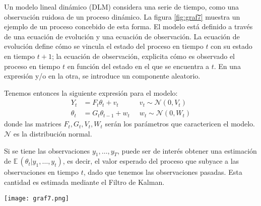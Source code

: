 \documentclass{article}\usepackage[]{graphicx}\usepackage[]{color}
\newcommand{\E}{\mathbb{E} \,}
\begin{document}
%

Un modelo lineal dinámico (DLM) considera una serie de tiempo, como una observación ruidosa de un proceso dinámico. La figura \ref{fig:graf7} muestra un ejemplo de un proceso concebido de esta forma. El modelo está definido a través de una ecuación de evolución y una ecuación de observación. La ecuación de evolución define cómo se vincula el estado del proceso en tiempo $t$ con su estado en tiempo $t+1$; la ecuación de observación, explicita cómo es observado el proceso en tiempo $t$ en función del estado en el que se encuentra a $t$. En una expresión y/o en la otra, se introduce un componente aleatorio.

Tenemos entonces la siguiente expresión para el modelo:
\begin{equation}
\begin{aligned}
Y_t&=F_t\theta_t + v_t  \;&\;  v_t \sim \mathcal{N}(0,V_t) \\
\theta_t &= G_t \theta_{t-1} + w_t \;&\; w_t \sim \mathcal{N}(0,W_t)
\end{aligned}
\label{eq:modelo}
\end{equation} donde las matrices $F_t,G_t,V_t,W_t$ serán los parámetros que caractericen el modelo. $\mathcal{N}$ es la distribución normal.

Si se tiene las observaciones $y_1,\dots,y_T$, puede ser de interés obtener una estimación de $\E(\theta_t | y_1,\dots,y_t)$, es decir, el valor esperado del proceso que subyace a las observaciones en tiempo $t$, dado que tenemos las observaciones pasadas. Esta cantidad es estimada mediante el Filtro de Kalman.

\begin{center}
\texttt{[image: graf7.png]}
\vspace{-.75em}
\label{fig:graf7}
\end{center}
\end{document}
